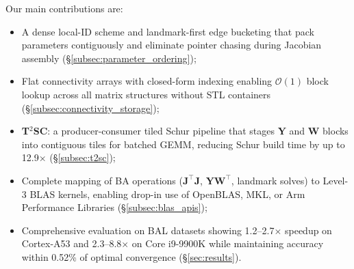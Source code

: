 Our main contributions are:
\begin{itemize}[leftmargin=*]\setlength\itemsep{2pt}
\item A dense local-ID scheme and landmark-first edge bucketing that pack parameters contiguously and eliminate 
pointer chasing during Jacobian assembly (\S\ref{subsec:parameter_ordering});
\item Flat connectivity arrays with closed-form indexing enabling $\mathcal{O}(1)$ 
block lookup across all matrix structures without STL containers (\S\ref{subsec:connectivity_storage});
\item \textbf{T$^{2}$SC}: a producer-consumer tiled Schur pipeline that stages $\mathbf{Y}$ and $\mathbf{W}$ blocks 
into contiguous tiles for batched GEMM, reducing Schur build time by up to 12.9$\times$ (\S\ref{subsec:t2sc});
\item Complete mapping of BA operations ($\mathbf{J}^{\top}\mathbf{J}$, $\mathbf{Y}\mathbf{W}^{\top}$, landmark solves) 
to Level-3 BLAS kernels, enabling drop-in use of OpenBLAS, MKL, or Arm Performance Libraries (\S\ref{subsec:blas_apis});
\item Comprehensive evaluation on BAL datasets showing 1.2--2.7$\times$ speedup on Cortex-A53 and 2.3--8.8$\times$ 
on Core i9-9900K while maintaining accuracy within 0.52\% of optimal convergence (\S\ref{sec:results}).
\end{itemize}
